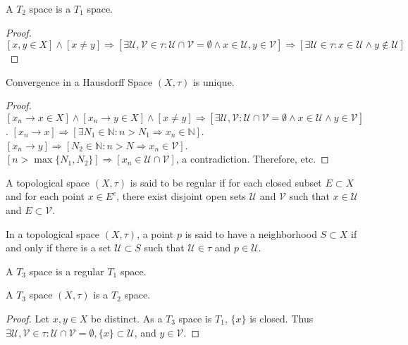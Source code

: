 \documentclass[crop=false,class=article,oneside]{standalone}
\begin{document}
            \begin{theorem}
            A $T_2$ space is a $T_1$ space.
            \end{theorem}
            \begin{proof}
            $[x,y\in X]\land [x\ne y]\Rightarrow [\exists \mathcal{U},\mathcal{V}\in \tau:\mathcal{U}\cap \mathcal{V}=\emptyset\land x\in \mathcal{U},y\in \mathcal{V}]\Rightarrow [\exists \mathcal{U}\in \tau:x\in \mathcal{U}\land y\notin \mathcal{U}]$
            \end{proof}
            \begin{theorem}
            Convergence in a Hausdorff Space $(X,\tau)$ is unique.
            \end{theorem}
            \begin{proof}
            $[x_n \rightarrow x\in X]\land [x_n \rightarrow y\in X]\land[x\ne y]\Rightarrow [\exists \mathcal{U},\mathcal{V}:\mathcal{U}\cap \mathcal{V}=\emptyset\land x\in \mathcal{U}\land y\in \mathcal{V}]$. $[x_n\rightarrow x]\Rightarrow [\exists N_1\in \mathbb{N}:n>N_1\Rightarrow x_n \in \mathbb{N}]$. $[x_n\rightarrow y]\Rightarrow [N_2\in \mathbb{N}:n>N\Rightarrow x_n \in \mathcal{V}]$. $[n>\max\{N_1,N_2\}]\Rightarrow [x_n \in \mathcal{U}\cap \mathcal{V}]$, a contradiction. Therefore, etc.
            \end{proof}
            \begin{definition}
            A topological space $(X,\tau)$ is said to be regular if for each closed subset $E\subset X$ and for each point $x\in E^c$, there exist disjoint open sets $\mathcal{U}$ and $\mathcal{V}$ such that $x\in \mathcal{U}$ and $E\subset \mathcal{V}$.
            \end{definition} 
            \begin{definition}
            In a topological space $(X,\tau)$, a point $p$ is said to have a neighborhood $S\subset X$ if and only if there is a set $\mathcal{U}\subset S$ such that $\mathcal{U}\in \tau$ and $p\in \mathcal{U}$.
            \end{definition}
            \begin{definition}
            A $T_3$ space is a regular $T_1$ space.
            \end{definition}
            \begin{theorem}
            A $T_3$ space $(X,\tau)$ is a $T_2$ space.
            \end{theorem}
            \begin{proof}
            Let $x,y\in X$ be distinct. As a $T_3$ space is $T_1$, $\{x\}$ is closed. Thus $\exists \mathcal{U},\mathcal{V}\in\tau: \mathcal{U}\cap\mathcal{V}=\emptyset, \{x\}\subset \mathcal{U}$, and $y\in \mathcal{V}$.
            \end{proof}
\end{document}
